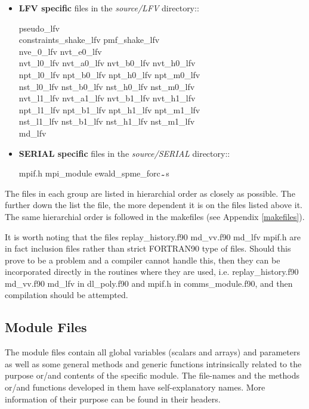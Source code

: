 \begin{itemize}
\item {\bf LFV specific} files in the {\em source/LFV} directory::

{\sc
pseudo\_lfv \\
constraints\_shake\_lfv pmf\_shake\_lfv \\
nve\_0\_lfv nvt\_e0\_lfv \\
nvt\_l0\_lfv nvt\_a0\_lfv nvt\_b0\_lfv nvt\_h0\_lfv \\
npt\_l0\_lfv npt\_b0\_lfv npt\_h0\_lfv npt\_m0\_lfv \\
nst\_l0\_lfv nst\_b0\_lfv nst\_h0\_lfv nst\_m0\_lfv \\
nvt\_l1\_lfv nvt\_a1\_lfv nvt\_b1\_lfv nvt\_h1\_lfv \\
npt\_l1\_lfv npt\_b1\_lfv npt\_h1\_lfv npt\_m1\_lfv \\
nst\_l1\_lfv nst\_b1\_lfv nst\_h1\_lfv nst\_m1\_lfv \\
md\_lfv}

\item {\bf SERIAL specific} files in the {\em source/SERIAL} directory::

{\sc mpif.h mpi\_module ewald\_spme\_forc$_{\verb"~"}$s}

\end{itemize}
The files in each group are listed in hierarchial order as closely
as possible.  The further down the list the file, the more dependent
it is on the files listed above it.  The same hierarchial order is
followed in the makefiles (see Appendix \ref{makefiles}).

It is worth noting that the files {\sc replay\_history.f90 md\_vv.f90 md\_lfv mpif.h}
are in fact inclusion files rather than strict FORTRAN90 
type of files.  Should this prove to be a problem and a compiler cannot handle
this, then they can be incorporated directly in the routines
where they are used, i.e. {\sc replay\_history.f90 md\_vv.f90 md\_lfv}
in {\sc dl\_poly.f90} and {\sc  mpif.h} in {\sc comms\_module.f90},
and then compilation should be attempted.

\subsection{Module Files}

The \D module files contain all global variables (scalars and
arrays) and parameters as well as some general methods and generic
functions intrinsically related to the purpose or/and contents of
the specific module.  The file-names and the methods or/and
functions developed in them have self-explanatory names.  More
information of their purpose can be found in their headers.

